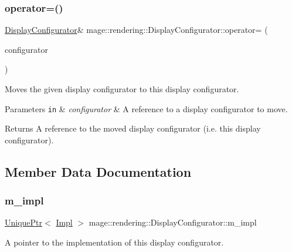 \subsubsection{\texorpdfstring{operator=()}{operator=()}\hspace{0.1cm}{\footnotesize\ttfamily [2/2]}}
{\footnotesize\ttfamily \mbox{\hyperlink{classmage_1_1rendering_1_1_display_configurator}{Display\+Configurator}}\& mage\+::rendering\+::\+Display\+Configurator\+::operator= (\begin{DoxyParamCaption}\item[{\mbox{\hyperlink{classmage_1_1rendering_1_1_display_configurator}{Display\+Configurator}} \&\&}]{configurator }\end{DoxyParamCaption})\hspace{0.3cm}{\ttfamily [delete]}}

Moves the given display configurator to this display configurator.


\begin{DoxyParams}[1]{Parameters}
\mbox{\tt in}  & {\em configurator} & A reference to a display configurator to move. \\
\hline
\end{DoxyParams}
\begin{DoxyReturn}{Returns}
A reference to the moved display configurator (i.\+e. this display configurator). 
\end{DoxyReturn}


\subsection{Member Data Documentation}
\mbox{\label{classmage_1_1rendering_1_1_display_configurator_a07b64b1b3443e4350723990592de86e7}} 
\subsubsection{\texorpdfstring{m\+\_\+impl}{m\_impl}}
{\footnotesize\ttfamily \mbox{\hyperlink{namespacemage_a3316d7143a973e37adf1110f2e80ca31}{Unique\+Ptr}}$<$ \mbox{\hyperlink{classmage_1_1rendering_1_1_display_configurator_1_1_impl}{Impl}} $>$ mage\+::rendering\+::\+Display\+Configurator\+::m\+\_\+impl\hspace{0.3cm}{\ttfamily [private]}}

A pointer to the implementation of this display configurator. 